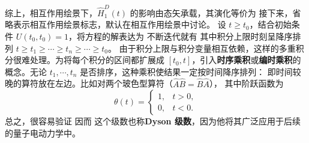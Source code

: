 综上，相互作用绘景下，$\hat H_1^D(t)$ 的影响由态矢承载，其演化等价为
接下来，省略表示相互作用绘景标志，默认在相互作用绘景中讨论。
设 $t\geqslant t_0$，结合初始条件 $U(t_0,t_0) = 1$，将方程的解表达为
不断迭代就有
其中积分上限时刻呈降序排列 $t\geqslant t_1\geqslant \cdots \geqslant t_n\geqslant\cdots\geqslant t_0$。
由于积分上限与积分变量相互依赖，这样的多重积分很难处理。为将每个积分的区间都扩展成 $[t_0, t]$，引入\textbf{时序乘积}或\textbf{编时乘积}的概念。无论 $t_1,\cdots,t_n$ 是否排序，这种乘积使结果一定按时间降序排列：
即时间较晚的算符放在左边。比如对两个玻色型算符（$\hat A\hat B = \hat B\hat A$），
其中阶跃函数为
\[
    \theta(t)=\begin{cases}
        1, & t>0,\\
        0, & t<0.
    \end{cases}
\]
总之，很容易验证
因而
这个级数也称\textbf{Dyson 级数}，因为他将其广泛应用于后续的量子电动力学中。

